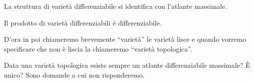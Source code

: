 \begin{oss}
	La struttura di varietà differenziabile si identifica con l'atlante massimale.
\end{oss}

\begin{fat}
	Il prodotto di varietà differenziabili è differenziabile.
\end{fat}

D'ora in poi chiameremo brevemente ``varietà'' le varietà lisce
e quando vorremo specificare che non è liscia la chiameremo ``varietà topologica''.

Data una varietà topologica esiste sempre un atlante differenziabile massimale? È unico?
Sono domande a cui non risponderemo.
